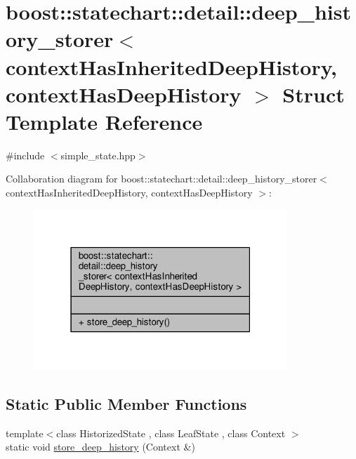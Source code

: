 \hypertarget{structboost_1_1statechart_1_1detail_1_1deep__history__storer}{}\section{boost\+:\+:statechart\+:\+:detail\+:\+:deep\+\_\+history\+\_\+storer$<$ context\+Has\+Inherited\+Deep\+History, context\+Has\+Deep\+History $>$ Struct Template Reference}
\label{structboost_1_1statechart_1_1detail_1_1deep__history__storer}


{\ttfamily \#include $<$simple\+\_\+state.\+hpp$>$}



Collaboration diagram for boost\+:\+:statechart\+:\+:detail\+:\+:deep\+\_\+history\+\_\+storer$<$ context\+Has\+Inherited\+Deep\+History, context\+Has\+Deep\+History $>$\+:
\nopagebreak
\begin{figure}[H]
\begin{center}
\leavevmode
\includegraphics[width=271pt]{structboost_1_1statechart_1_1detail_1_1deep__history__storer__coll__graph}
\end{center}
\end{figure}
\subsection*{Static Public Member Functions}
\begin{DoxyCompactItemize}
\item 
{\footnotesize template$<$class Historized\+State , class Leaf\+State , class Context $>$ }\\static void \mbox{\hyperlink{structboost_1_1statechart_1_1detail_1_1deep__history__storer_aca49f91b83e8b635b55760b6b29d0c3d}{store\+\_\+deep\+\_\+history}} (Context \&)
\end{DoxyCompactItemize}


